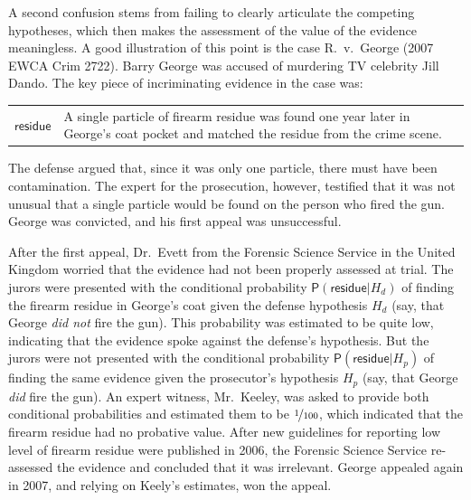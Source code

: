 \documentclass[
  10pt,
  dvipsnames,enabledeprecatedfontcommands]{scrartcl}
\newcommand{\pr}[1]{\mathsf{P}(#1)}
\begin{document}
A second confusion stems from failing to clearly articulate the
competing hypotheses, which then makes the assessment of the value of
the evidence meaningless. A good illustration of this point is the case
R.~v.~George (2007 EWCA Crim 2722). Barry George was accused of
murdering TV celebrity Jill Dando. The key piece of incriminating
evidence in the case was:

\begin{center}
\begin{tabular}{lp{12cm}} 
    $\textsf{residue}$ &  
    A single particle of firearm  residue was found one year later in George's coat pocket and matched the residue from the crime scene. 
\end{tabular}
\end{center}

\noindent  The defense argued that, since it was only one particle,
there must have been contamination. The expert for the prosecution,
however, testified that it was not unusual that a single particle would
be found on the person who fired the gun. George was convicted, and his
first appeal was unsuccessful.

After the first appeal, Dr.~Evett from the Forensic Science Service in
the United Kingdom worried that the evidence had not been properly
assessed at trial. The jurors were presented with the conditional
probability \(\pr{\textsf{residue}\vert H_d}\) of finding the firearm
residue in George's coat given the defense hypothesis \(H_d\) (say, that
George \textit{did not} fire the gun). This probability was estimated to
be quite low, indicating that the evidence spoke against the defense's
hypothesis. But the jurors were not presented with the conditional
probability \(\pr{\textsf{residue}\vert H_p}\) of finding the same
evidence given the prosecutor's hypothesis \(H_p\) (say, that George
\textit{did} fire the gun). An expert witness, Mr.~Keeley, was asked to
provide both conditional probabilities and estimated them to be
\(\nicefrac{1}{100}\), which indicated that the firearm residue had no
probative value. After new guidelines for reporting low level of firearm
residue were published in 2006, the Forensic Science Service re-assessed
the evidence and concluded that it was irrelevant. George appealed again
in 2007, and relying on Keely's estimates, won the appeal.
\end{document}
